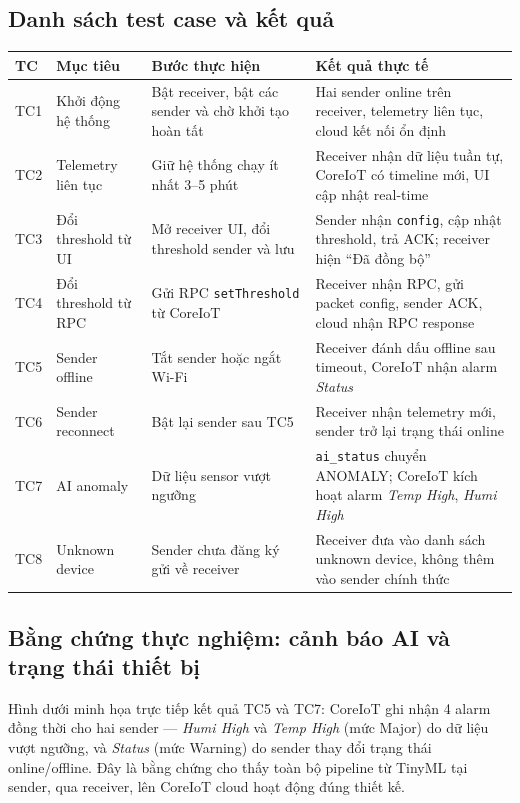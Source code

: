 \documentclass[12pt,a4paper]{report}
\begin{document}
\subsection{Danh sách test case và kết quả}
{\setlength{\tabcolsep}{4pt}
\begin{longtable}{p{}p{}p{}p{}}
\toprule
TC & Mục tiêu & Bước thực hiện & Kết quả thực tế \\
\midrule
\endhead
TC1 & Khởi động hệ thống & Bật receiver, bật các sender và chờ khởi tạo hoàn tất & Hai sender online trên receiver, telemetry liên tục, cloud kết nối ổn định \\[3pt]
TC2 & Telemetry liên tục & Giữ hệ thống chạy ít nhất 3--5 phút & Receiver nhận dữ liệu tuần tự, CoreIoT có timeline mới, UI cập nhật real-time \\[3pt]
TC3 & Đổi threshold từ UI & Mở receiver UI, đổi threshold sender và lưu & Sender nhận \texttt{config}, cập nhật threshold, trả ACK; receiver hiện ``Đã đồng bộ'' \\[3pt]
TC4 & Đổi threshold từ RPC & Gửi RPC \texttt{setThreshold} từ CoreIoT & Receiver nhận RPC, gửi packet config, sender ACK, cloud nhận RPC response \\[3pt]
TC5 & Sender offline & Tắt sender hoặc ngắt Wi-Fi & Receiver đánh dấu offline sau timeout, CoreIoT nhận alarm \textit{Status} \\[3pt]
TC6 & Sender reconnect & Bật lại sender sau TC5 & Receiver nhận telemetry mới, sender trở lại trạng thái online \\[3pt]
TC7 & AI anomaly & Dữ liệu sensor vượt ngưỡng & \texttt{ai\_status} chuyển ANOMALY; CoreIoT kích hoạt alarm \textit{Temp High}, \textit{Humi High} \\[3pt]
TC8 & Unknown device & Sender chưa đăng ký gửi về receiver & Receiver đưa vào danh sách unknown device, không thêm vào sender chính thức \\
\bottomrule
\end{longtable}
}

\subsection{Bằng chứng thực nghiệm: cảnh báo AI và trạng thái thiết bị}
Hình dưới minh họa trực tiếp kết quả TC5 và TC7: CoreIoT ghi nhận 4 alarm đồng thời cho hai sender --- \textit{Humi High} và \textit{Temp High} (mức Major) do dữ liệu vượt ngưỡng, và \textit{Status} (mức Warning) do sender thay đổi trạng thái online/offline. Đây là bằng chứng cho thấy toàn bộ pipeline từ TinyML tại sender, qua receiver, lên CoreIoT cloud hoạt động đúng thiết kế.
\end{document}
